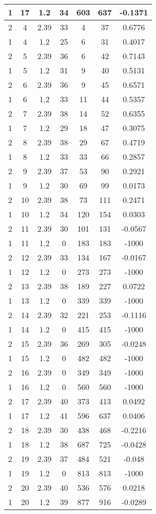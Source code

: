 \documentclass[letterpaper, 12pt]{article}
\begin{document}
\begin{longtable}{|c|c|c|c|c|c|c|}
\hline
1 & 17 & 1.2 & 34 & 603 & 637 & -0.1371 \\
\hline
2 & 4 & 2.39 & 33 & 4 & 37 & 0.6776 \\
\hline
1 & 4 & 1.2 & 25 & 6 & 31 & 0.4017 \\
\hline
2 & 5 & 2.39 & 36 & 6 & 42 & 0.7143 \\
\hline
1 & 5 & 1.2 & 31 & 9 & 40 & 0.5131 \\
\hline
2 & 6 & 2.39 & 36 & 9 & 45 & 0.6571 \\
\hline
1 & 6 & 1.2 & 33 & 11 & 44 & 0.5357 \\
\hline
2 & 7 & 2.39 & 38 & 14 & 52 & 0.6355 \\
\hline
1 & 7 & 1.2 & 29 & 18 & 47 & 0.3075 \\
\hline
2 & 8 & 2.39 & 38 & 29 & 67 & 0.4719 \\
\hline
1 & 8 & 1.2 & 33 & 33 & 66 & 0.2857 \\
\hline
2 & 9 & 2.39 & 37 & 53 & 90 & 0.2921 \\
\hline
1 & 9 & 1.2 & 30 & 69 & 99 & 0.0173 \\
\hline
2 & 10 & 2.39 & 38 & 73 & 111 & 0.2471 \\
\hline
1 & 10 & 1.2 & 34 & 120 & 154 & 0.0303 \\
\hline
2 & 11 & 2.39 & 30 & 101 & 131 & -0.0567 \\
\hline
1 & 11 & 1.2 & 0 & 183 & 183 & -1000 \\
\hline
2 & 12 & 2.39 & 33 & 134 & 167 & -0.0167 \\
\hline
1 & 12 & 1.2 & 0 & 273 & 273 & -1000 \\
\hline
2 & 13 & 2.39 & 38 & 189 & 227 & 0.0722 \\
\hline
1 & 13 & 1.2 & 0 & 339 & 339 & -1000 \\
\hline
2 & 14 & 2.39 & 32 & 221 & 253 & -0.1116 \\
\hline
1 & 14 & 1.2 & 0 & 415 & 415 & -1000 \\
\hline
2 & 15 & 2.39 & 36 & 269 & 305 & -0.0248 \\
\hline
1 & 15 & 1.2 & 0 & 482 & 482 & -1000 \\
\hline
2 & 16 & 2.39 & 0 & 349 & 349 & -1000 \\
\hline
1 & 16 & 1.2 & 0 & 560 & 560 & -1000 \\
\hline
2 & 17 & 2.39 & 40 & 373 & 413 & 0.0492 \\
\hline
1 & 17 & 1.2 & 41 & 596 & 637 & 0.0406 \\
\hline
2 & 18 & 2.39 & 30 & 438 & 468 & -0.2216 \\
\hline
1 & 18 & 1.2 & 38 & 687 & 725 & -0.0428 \\
\hline
2 & 19 & 2.39 & 37 & 484 & 521 & -0.048 \\
\hline
1 & 19 & 1.2 & 0 & 813 & 813 & -1000 \\
\hline
2 & 20 & 2.39 & 40 & 536 & 576 & 0.0218 \\
\hline
1 & 20 & 1.2 & 39 & 877 & 916 & -0.0289 \\
\hline
\end{longtable}
\end{document}
